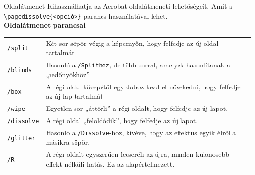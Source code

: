 \documentclass{beamer}
\begin{document}
\begin{frame}[fragile]{Oldalátmenet}
Kihasználhatja az Acrobat oldalátmeneti lehetőségeit.
Amit a \color{red}\verb|\pagedissolve{<opció>}| \color{black}  parancs használatával lehet.\\
\textbf{Oldalátmenet parancsai} \\
\begin{table}[h]
\begin{tabularx}{\textwidth}{l X}
\verb|/split| & Két sor söpör végig a képernyőn, hogy felfedje az új oldal tartalmát \\
\verb|/blinds| & Hasonló a \verb|/Splithez|, de több sorral, amelyek hasonlítanak a „redőnyökhöz” \\

\verb|/box|& A régi oldal közepétől egy doboz kezd el növekedni, hogy felfedje az új lap tartalmát \\

\verb|/wipe|& Egyetlen sor „áttörli” a régi oldalt, hogy felfedje az új lapot. \\

\verb|/dissolve|& A régi oldal „feloldódik”, hogy felfedje az új lapot. \\

 \verb|/glitter|& Hasonló a \verb|/Dissolve|-hoz, kivéve, hogy az effektus egyik élről a másikra söpör. \\

\verb|/R|&  A régi oldalt egyszerűen lecseréli az újra, minden különösebb effekt nélküli hatás. Ez az alapértelmezett. \\


\end{tabularx}
\end{table}

\end{frame}
\end{document}
